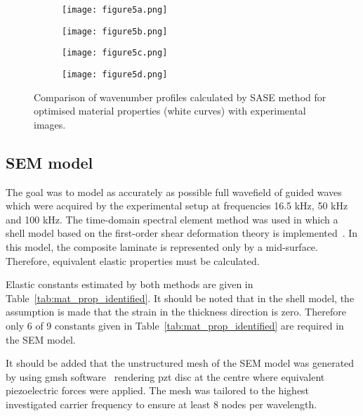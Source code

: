 \documentclass[preprint,12pt]{elsarticle}
\begin{document}
\begin{figure} [h!]
	\centering
	\begin{subfigure}[b]{0.47\textwidth}
		\centering
		\texttt{[image: figure5a.png]}
		\label{fig:freq3_slice_opt}
	\end{subfigure}
	\hfill
	\begin{subfigure}[b]{0.47\textwidth}
		\centering
		\texttt{[image: figure5b.png]}
		\label{fig:freq4_slice_opt}
	\end{subfigure}
	\hfill
	\begin{subfigure}[b]{0.47\textwidth}
		\centering
		\texttt{[image: figure5c.png]}
		\label{fig:freq5_slice_opt}
	\end{subfigure}
	\hfill
	\begin{subfigure}[b]{0.47\textwidth}
		\centering
		\texttt{[image: figure5d.png]}
		\label{fig:freq7_slice_opt}
	\end{subfigure}
	\caption{Comparison of wavenumber profiles calculated by SASE method for optimised material properties (white curves) with experimental images.}
	\label{fig:freq_slice_opt}
\end{figure}
\subsection{SEM model}
The goal was to model as accurately as possible full wavefield of guided waves which were acquired by the experimental setup at frequencies 16.5 kHz, 50 kHz and 100 kHz. 
The time-domain spectral element method was used in which a shell model based on the first-order shear deformation theory is implemented~\cite{Kudela2020a}. 
In this model, the composite laminate is represented only by a mid-surface. Therefore, equivalent elastic properties must be calculated. 

Elastic constants estimated by both methods are given in Table~\ref{tab:mat_prop_identified}. 
It should be noted that in the shell model, the assumption is made that the strain in the thickness direction is zero. 
Therefore only 6 of 9 constants given in Table~\ref{tab:mat_prop_identified} are required in the SEM model.

It should be added that the unstructured mesh of the SEM model was generated by using gmsh software~\cite{Geuzaine2009} rendering pzt disc at the centre where equivalent piezoelectric forces were applied. 
The mesh was tailored to the highest investigated carrier frequency to ensure at least 8 nodes per wavelength.
\end{document}
